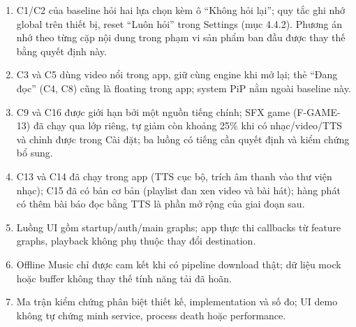 \begin{enumerate}
\item C1/C2 của baseline hỏi hai lựa chọn kèm ô ``Không hỏi lại''; quy tắc ghi nhớ global trên thiết bị, reset ``Luôn hỏi'' trong Settings (mục 4.4.2). Phương án nhớ theo từng cặp nội dung trong phạm vi sản phẩm ban đầu được thay thế bằng quyết định này.
\item C3 và C5 dùng video nổi trong app, giữ cùng engine khi mở lại; thẻ ``Đang đọc'' (C4, C8) cũng là floating trong app; system PiP nằm ngoài baseline này.
\item C9 và C16 được giới hạn bởi một nguồn tiếng chính; SFX game (F-GAME-13) đã chạy qua lớp riêng, tự giảm còn khoảng 25\% khi có nhạc/video/TTS và chỉnh được trong Cài đặt; ba luồng có tiếng cần quyết định và kiểm chứng bổ sung.
\item C13 và C14 đã chạy trong app (TTS cục bộ, trích âm thanh vào thư viện nhạc); C15 đã có bản cơ bản (playlist đan xen video và bài hát); hàng phát có thêm bài báo đọc bằng TTS là phần mở rộng của giai đoạn sau.
\item Luồng UI gồm startup/auth/main graphs; app thực thi callbacks từ feature graphs, playback không phụ thuộc thay đổi destination.
\item Offline Music chỉ được cam kết khi có pipeline download thật; dữ liệu mock hoặc buffer không thay thế tính năng tải đã hoãn.
\item Ma trận kiểm chứng phân biệt thiết kế, implementation và số đo; UI demo không tự chứng minh service, process death hoặc performance.
\end{enumerate}
